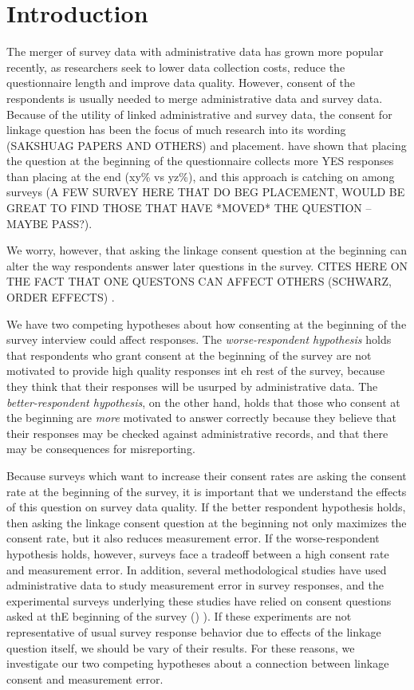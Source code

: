 \section{Introduction}

The merger of survey data with administrative data has grown more popular recently, as researchers seek to lower data collection costs, reduce the questionnaire length and improve data quality. However, consent of the respondents is usually needed to merge administrative data and survey data. Because of the utility of linked administrative and survey data, the consent for linkage question has been the focus of much research into its wording (SAKSHUAG PAPERS AND OTHERS) and placement. \cite{Sakshaugetal13} have shown that placing the question at the beginning of the questionnaire collects more YES responses than placing at the end (xy\% vs yz\%), and this approach is catching on among surveys (A FEW SURVEY HERE THAT DO BEG PLACEMENT, WOULD BE GREAT TO FIND THOSE THAT HAVE *MOVED* THE QUESTION -- MAYBE PASS?). 

We worry, however, that asking the linkage consent question at the beginning can alter the way respondents answer later questions in the survey. CITES HERE ON THE FACT THAT ONE QUESTONS CAN AFFECT OTHERS (SCHWARZ, ORDER EFFECTS) \cite{McFarland81}. 

We have two competing hypotheses about how consenting at the beginning of the survey interview could affect responses. The \textit{worse-respondent hypothesis} holds that respondents who grant consent at the beginning of the survey are not motivated to provide high quality responses int eh rest of the survey, because they think that their responses will be usurped by administrative data. The \textit{better-respondent hypothesis}, on the other hand, holds that those who consent at the beginning are \textit{more} motivated to answer correctly because they believe that their responses may be checked against administrative records, and that there may be consequences for misreporting. 

Because surveys which want to increase their consent rates are asking the consent rate at the beginning of the survey, it is important that we understand the effects of this question on survey data quality. If the better respondent hypothesis holds, then asking the linkage consent question at the beginning not only maximizes the consent rate, but it also reduces measurement error. If the worse\--respondent hypothesis holds, however, surveys face a tradeoff between a high consent rate and  measurement error. In addition, several methodological studies have used administrative data to study measurement error in survey responses, and the experimental surveys underlying these studies have relied on consent questions asked at thE beginning of the survey (\cite{Kreuteretal10,Kreuteretal14}) \cite{Eckmanetal14} \cite{Eckmanetal15b}). If these experiments are not representative of usual survey response behavior due to effects of the linkage question itself, we should be vary of their results. For these reasons, we investigate our two competing hypotheses about a connection between linkage consent and measurement error.


